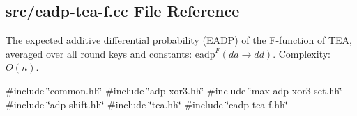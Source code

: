\hypertarget{eadp-tea-f_8cc}{\subsection{src/eadp-\/tea-\/f.cc \-File \-Reference}
\label{eadp-tea-f_8cc}
}


\-The expected additive differential probability (\-E\-A\-D\-P) of the \-F-\/function of \-T\-E\-A, averaged over all round keys and constants\-: $\mathrm{eadp}^{F}(da \rightarrow dd)$. \-Complexity\-: $O(n)$.  


{\ttfamily \#include \char`\"{}common.\-hh\char`\"{}}\*
{\ttfamily \#include \char`\"{}adp-\/xor3.\-hh\char`\"{}}\*
{\ttfamily \#include \char`\"{}max-\/adp-\/xor3-\/set.\-hh\char`\"{}}\*
{\ttfamily \#include \char`\"{}adp-\/shift.\-hh\char`\"{}}\*
{\ttfamily \#include \char`\"{}tea.\-hh\char`\"{}}\*
{\ttfamily \#include \char`\"{}eadp-\/tea-\/f.\-hh\char`\"{}}\*
